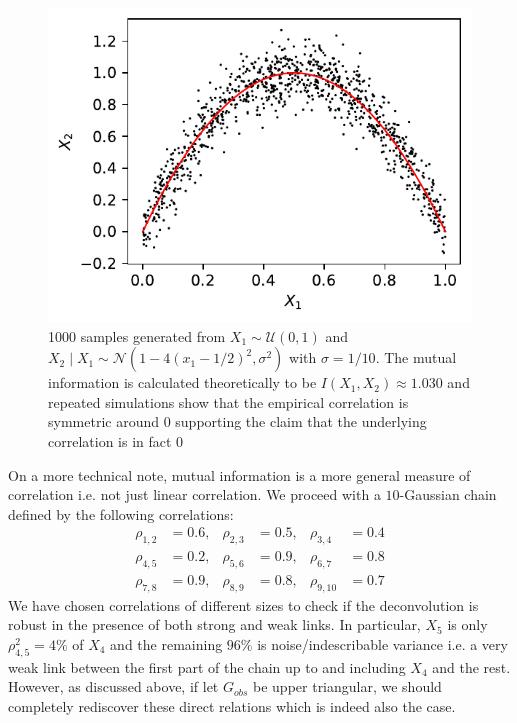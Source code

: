 \documentclass[../Thesis.tex]{subfiles}
\begin{document}
\begin{figure}[ht]
    \centering
    \includegraphics[width=.6\linewidth]{figures/Mutual information figures/parabola example.pdf}
    \caption{1000 samples generated from $X_1\sim \mathcal{U}\left(0,1\right)$ and $X_2 \mid X_1 \sim \mathcal{N}\left(1 - 4\left(x_1 - 1/2\right)^2 , \sigma^2\right)$ with $\sigma = 1/10$. The mutual information is calculated theoretically to be $I\left(X_1,X_2\right) \approx 1.030$ and repeated simulations show that the empirical correlation is symmetric around $0$ supporting the claim that the underlying correlation is in fact $0$} %
    \label{fig:MI parabola example}
\end{figure}
On a more technical note, mutual information is a more general measure of correlation i.e. not just linear correlation. We proceed with a $10$-Gaussian chain defined by the following correlations:
\begin{equation}\label{eq:Example Gaussian chain}
    \begin{aligned}
        \rho_{1,2} & = 0.6, & \rho_{2,3} & = 0.5, & \rho_{3,4}  & = 0.4 \\
        \rho_{4,5} & = 0.2, & \rho_{5,6} & = 0.9, & \rho_{6,7}  & = 0.8 \\
        \rho_{7,8} & = 0.9, & \rho_{8,9} & = 0.8, & \rho_{9,10} & = 0.7
    \end{aligned}
\end{equation}
We have chosen correlations of different sizes to check if the deconvolution is robust in the presence of both strong and weak links. In particular, $X_5$ is only $\rho_{4,5}^2 = 4\%$ of $X_4$ and the remaining $96\%$ is noise/indescribable variance i.e. a very weak link between the first part of the chain up to and including $X_4$ and the rest. However, as discussed above, if let $G_{obs}$ be upper triangular, we should completely rediscover these direct relations which is indeed also the case.
\end{document}

